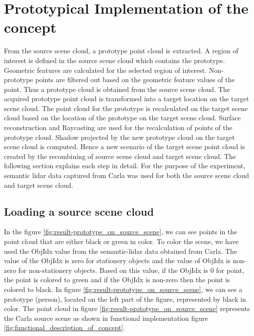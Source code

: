 \chapter{Prototypical Implementation of the concept}
From the source scene cloud, a prototype point cloud is extracted. A region of interest is defined in the source scene cloud which contains the prototype. Geometric features are calculated for the selected region of interest. Non-prototype points are filtered out based on the geometric feature values of the point. Thus a prototype cloud is obtained from the source scene cloud. The acquired prototype point cloud is transformed into a target location on the target scene cloud. The point cloud for the prototype is recalculated on the target scene cloud based on the location of the prototype on the target scene cloud. Surface reconstruction and Raycasting are used for the recalculation of points of the prototype cloud. Shadow projected by the new prototype cloud on the target scene cloud is computed. Hence a new scenario of the target scene point cloud is created by the recombining of source scene cloud and target scene cloud. The following section explains each step in detail. 
For the purpose of the experiment, semantic lidar data captured from Carla was used for both the source scene cloud and target scene cloud.

\section{Loading a source scene cloud}
 In the figure \ref{fig:result-prototype_on_source_scene}, we can see points in the point cloud that are either black or green in color. To color the scene, we have used the ObjIdx value from the semantic-lidar data obtained from Carla. The value of the ObjIdx is zero for stationery objects and the value of ObjIdx is non-zero for non-stationery objects. Based on this value, if the ObjIdx is 0 for point, the point is colored to green and if the ObjIdx is non-zero then the point is colored to black. In figure \ref{fig:result-prototype_on_source_scene}, we can see a prototype (person), located on the left part of the figure, represented by black in color. The point cloud in figure \ref{fig:result-prototype_on_source_scene} represents the Carla source scene as shown in functional implementation figure \ref{fig:functional_description_of_concept}.

